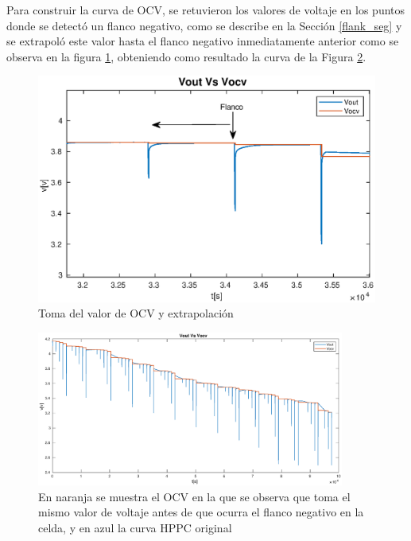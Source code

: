\documentclass[10pt, a4paper]{report}
\begin{document}
Para construir la curva de \acrshort{OCV}, se retuvieron los valores de voltaje
en los puntos donde se detect\'o un flanco negativo, como se describe en la
Secci\'on \ref{flank_seg} y se extrapoló este valor hasta el flanco negativo
inmediatamente anterior como se observa en la figura
\ref{fig:ocv_detection_closeup}, obteniendo como resultado la curva de la Figura
\ref{fig:ocv_detection}.

\begin{figure}[h!]
    \begin{center}
        \includegraphics[width=.6\textwidth]{ocv_detection_closeup.eps}
        \caption{Toma del valor de \acrshort{OCV} y extrapolación}
        \label{fig:ocv_detection_closeup}
    \end{center}
\end{figure}
\FloatBarrier

\begin{figure}[h!]
    \begin{center}
        \includegraphics[width=0.9\textwidth]{ocv_detection.eps}
        \caption{En naranja se muestra el \acrshort{OCV} en la que se observa
        que toma el mismo valor de voltaje antes de que ocurra el flanco
        negativo en la celda, y en azul la curva \acrshort{HPPC} original}
        \label{fig:ocv_detection}
    \end{center}
\end{figure}
\FloatBarrier
\end{document}

